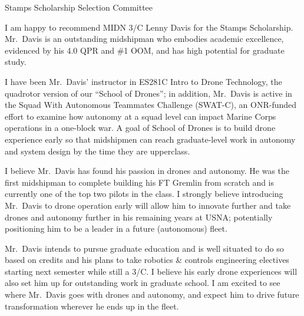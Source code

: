 \documentclass[12pt]{wrceletter}
\date{\today}
\begin{document}
\begin{letter}{%
Stamps Scholarship Selection Committee}

\opening{}

I am happy to recommend MIDN 3/C Lenny Davis for the Stamps Scholarship.  Mr.~Davis is an outstanding midshipman who embodies academic excellence, evidenced by his 4.0 QPR and \#1 OOM, and has high potential for graduate study.  

I have been Mr.~Davis’ instructor in ES281C Intro to Drone Technology, the quadrotor version of our ``School of Drones''; in addition, Mr.~Davis is active in the Squad With Autonomous Teammates Challenge (SWAT-C), an ONR-funded effort to examine how autonomy at a squad level can impact Marine Corps operations in a one-block war. A goal of School of Drones is to build drone experience early so that midshipmen can reach graduate-level work in autonomy and system design by the time they are upperclass. 

I believe Mr.~Davis has found his passion in drones and autonomy. He was the first midshipman to complete building his FT Gremlin from scratch and is currently one of the top two pilots in the class. I strongly believe introducing Mr.~Davis to drone operation early will allow him to innovate further and take drones and autonomy further in his remaining years at USNA; potentially positioning him to be a leader in a future (autonomous) fleet. 

Mr.~Davis intends to pursue graduate education and is well situated to do so based on credits and his plans to take robotics \& controls engineering electives starting next semester while still a 3/C. I believe his early drone experiences will also set him up for outstanding work in graduate school. I am excited to see where Mr.~Davis goes with drones and autonomy, and expect him to drive future transformation wherever he ends up in the fleet.

\closing{~} %

\end{letter}
\end{document}

